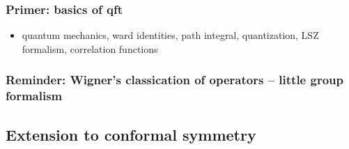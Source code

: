 \documentclass[12pt]{article}
\numberwithin{equation}{section}
\begin{document}
\subsubsection{Primer: basics of qft}
\begin{itemize}
	\item quantum mechanics, ward identities, path integral, quantization,
	LSZ formalism, correlation functions
\end{itemize}
\subsubsection{Reminder: Wigner's classication of operators -- little group formalism}
\subsection{Extension to conformal symmetry}


{}

\end{document}
